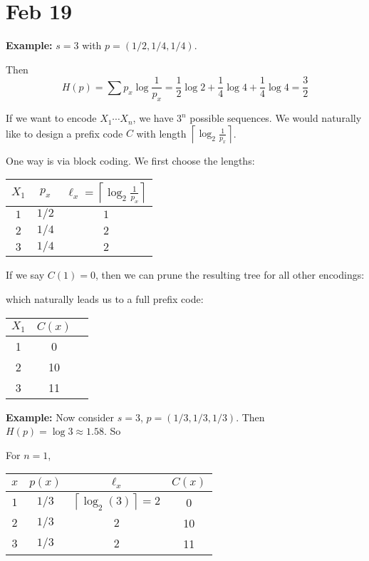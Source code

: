 \documentclass[12pt]{report}
\newcommand{\ceil}[1]{\left\lceil #1 \right\rceil}
\newcommand*{\tbf}[1]{\ifmmode\mathbf{#1}\else\textbf{#1}\fi}
\begin{document}
\section{Feb 19}
\tbf{Example:} $s = 3$ with $p = (1/2, 1/4, 1/4)$.

Then
\[H(p) = \sum p_x \log \frac{1}{p_x} = \frac{1}{2} \log 2 + \frac{1}{4} \log 4 + \frac{1}{4} \log 4 = \frac{3}{2}\]

If we want to encode $X_1\cdots X_n$, we have $3^n$ possible sequences. We would naturally like to design a prefix code $C$ with length $\ceil{\log_2 \frac{1}{p_x}}$.

One way is via block coding. We first choose the lengths:

\qquad \begin{tabular}{ccc}
	$X_1$ & $p_x$ & $\ell_x = \ceil{\log_2 \frac{1}{p_x}}$ \\\hline
	$1$   & $1/2$ & $1$                                    \\
	$2$   & $1/4$ & $2$                                    \\
	$3$   & $1/4$ & $2$
\end{tabular}

If we say $C(1) = 0$, then we can prune the resulting tree for all other encodings:
\begin{center}
\end{center}
which naturally leads us to a full prefix code:

\qquad \begin{tabular}{ccc}
	$X_1$ & $C(x)$ \\\hline
	1     & 0      \\
	2     & 10     \\
	3     & 11
\end{tabular}

\tbf{Example:} Now consider $s = 3$, $p = (1/3, 1/3, 1/3)$. Then $H(p) = \log 3 \approx 1.58$. So

For $n = 1$,

\qquad \begin{tabular}{cccc}
	$x$ & $p(x)$ & $\ell_x$               & $C(x)$ \\\hline
	$1$ & $1/3$  & $\ceil{\log_2(3)} = 2$ & 0      \\
	$2$ & $1/3$  & $2$                    & 10     \\
	$3$ & $1/3$  & $2$                    & 11
\end{tabular}
\end{document}
